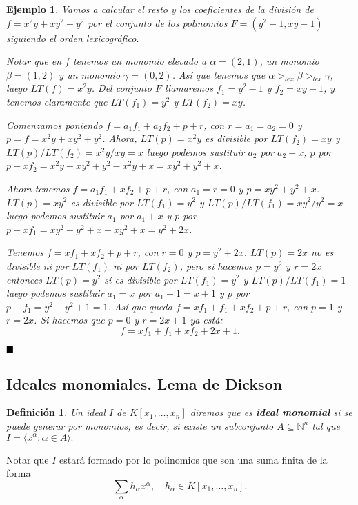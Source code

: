 \documentclass[12pt]{article}
\newtheorem{definition}[theorem]{Definición}
\newtheorem{example}{Ejemplo}[theorem]
\begin{document}
\begin{example}Vamos a calcular el resto y los coeficientes de la división de $f=x^2y+xy^2+y^2$ por el conjunto de los polinomios $F=(y^2-1, xy-1)$ siguiendo el orden lexicográfico. 

Notar que en $f$ tenemos un monomio elevado a $\alpha=(2,1)$, un monomio $\beta=(1,2)$ y un monomio $\gamma=(0,2)$. Así que tenemos que $\alpha >_{lex} \beta >_{lex} \gamma$, luego $LT(f)=x^2y$. Del conjunto $F$ llamaremos $f_1=y^2-1$ y $f_2=xy-1$, y tenemos claramente que $LT(f_1)=y^2$ y $LT(f_2)=xy$.

Comenzamos poniendo $f=a_1f_1+a_2f_2+p+r$, con $r=a_1=a_2=0$ y $p=f=x^2y+xy^2+y^2$. Ahora, $LT(p)=x^2y$ es divisible por $LT(f_2)=xy$ y $LT(p)/LT(f_2)=x^2y/xy=x$ luego podemos sustituir $a_2$ por $a_2 +x$, $p$ por $p-xf_2 = x^2y+xy^2+y^2-x^2y +x = xy^2 +y^2+x$.

Ahora tenemos $f=a_1f_1 +xf_2 + p +r$, con $a_1 = r = 0$ y $p = xy^2 + y^2+x$. $LT(p) = xy^2$ es divisible por $LT(f_1) = y^2$ y $LT(p)/LT(f_1) = xy^2/y^2 = x$ luego podemos sustituir $a_1$ por $a_1 +x$ y $p$ por $p-xf_1 = xy^2+y^2+x -xy^2+x =y^2+2x$.

Tenemos $f=xf_1 + xf_2 + p + r$, con $r=0$ y $p=y^2+2x$. $LT(p) = 2x$ no es divisible ni por $LT(f_1)$ ni por $LT(f_2)$, pero si hacemos $p=y^2$ y $r=2x$ entonces $LT(p)=y^2$ sí es divisible por $LT(f_1)=y^2$ y $LT(p)/LT(f_1)=1$ luego podemos sustituir $a_1 = x$ por $a_1+1 = x+1$ y $p$ por $p-f_1 = y^2-y^2+1 = 1$. Así que queda $f = xf_1 + f_1 + xf_2 + p + r$, con $p=1$ y $r=2x$. Si hacemos que $p=0$ y $r=2x+1$ ya está: 
$$f = xf_1 + f_1 + xf_2 + 2x+1.$$
\end{example}
$\hfill \blacksquare$

\subsection{Ideales monomiales. Lema de Dickson}

\begin{definition}Un ideal $I$ de $K[x_1, \ldots, x_n]$ diremos que es \textbf{ideal monomial} si se puede generar por monomios, es decir, si existe un subconjunto $A \subseteq \mathbb{N}^n$ tal que $I = \langle x^\alpha: \alpha \in A\rangle.$
\end{definition}

Notar que $I$ estará formado por lo polinomios que son una suma finita de la forma $$\sum_\alpha h_\alpha x^\alpha, \quad h_\alpha \in K[x_1, \ldots, x_n].$$
\end{document}
